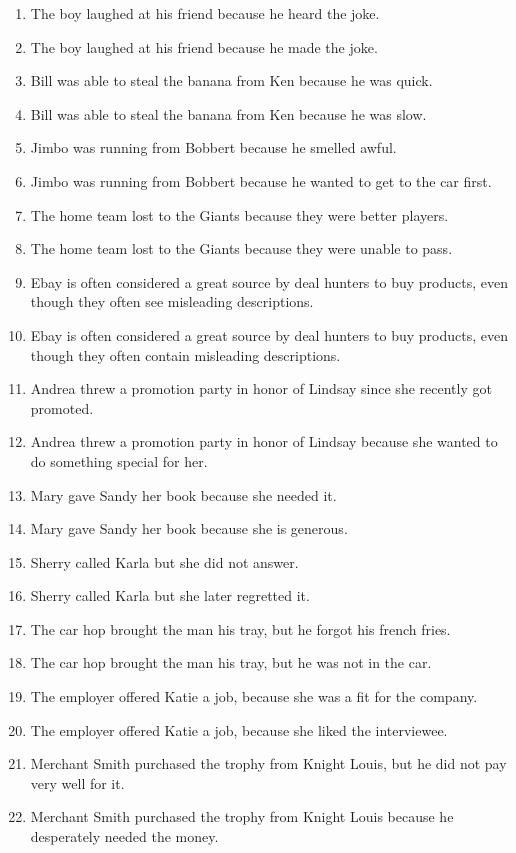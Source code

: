 \documentclass{article}
\begin{document}
\begin{enumerate}
	\item The boy laughed at his friend because he heard the joke.
	\item The boy laughed at his friend because he made the joke.
	\item Bill was able to steal the banana from Ken because he was quick.
	\item Bill was able to steal the banana from Ken because he was slow.
	\item Jimbo was running from Bobbert because he smelled awful.
	\item Jimbo was running from Bobbert because he wanted to get to the car first.
	\item The home team lost to the Giants because they were better players.
	\item The home team lost to the Giants because they were unable to pass.
	\item Ebay is often considered a great source by deal hunters to buy products, even though they often see misleading descriptions.
	\item Ebay is often considered a great source by deal hunters to buy products, even though they often contain misleading descriptions.
	\item Andrea threw a promotion party in honor of Lindsay since she recently got promoted.
	\item Andrea threw a promotion party in honor of Lindsay because she wanted to do something special for her.
	\item Mary gave Sandy her book because she needed it.
	\item Mary gave Sandy her book because she is generous.
	\item Sherry called Karla but she did not answer.
	\item Sherry called Karla but she later regretted it.
	\item The car hop brought the man his tray, but he forgot his french fries.
	\item The car hop brought the man his tray, but he was not in the car.
	\item The employer offered Katie a job, because she was a fit for the company.
	\item The employer offered Katie a job, because she liked the interviewee.
	\item Merchant Smith purchased the trophy from Knight Louis, but he did not pay very well for it.
	\item Merchant Smith purchased the trophy from Knight Louis because he desperately needed the money.

\end{enumerate}
\end{document}
